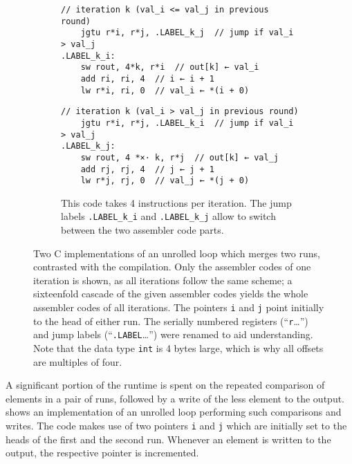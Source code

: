 \begin{figure}
\begin{subfigure}{\textwidth}
\begin{minipage}{\codewidth}
		\end{minipage}
		\hfill
		\begin{minipage}{\assemblerwidth}
			\begin{lstlisting}[language={[DPU]Assembler}]
// iteration k (val_i <= val_j in previous round)
	jgtu r*i, r*j, .LABEL_k_j  // jump if val_i > val_j
.LABEL_k_i:
	sw rout, 4*k, r*i  // out[k] ← val_i
	add ri, ri, 4  // i ← i + 1
	lw r*i, ri, 0  // val_i ← *(i + 0)
			\end{lstlisting}
			\smallskip
			\begin{lstlisting}[language={[DPU]Assembler}]
// iteration k (val_i > val_j in previous round)
	jgtu r*i, r*j, .LABEL_k_i  // jump if val_i > val_j
.LABEL_k_j:
	sw rout, 4 *×· k, r*j  // out[k] ← val_j
	add rj, rj, 4  // j ← j + 1
	lw r*j, rj, 0  // val_j ← *(j + 0)
			\end{lstlisting}
		\end{minipage}
		\caption{
			This code takes 4 instructions per iteration.
			The jump labels \lstinline|.LABEL_k_i| and \lstinline|.LABEL_k_j| allow to switch between the two assembler code parts.
		}
		\label{fig:merge:load:once}
	\end{subfigure}
	\caption{
		Two C implementations of an unrolled loop which merges two runs, contrasted with the compilation.
		Only the assembler codes of one iteration is shown, as all iterations follow the same scheme;
		a sixteenfold cascade of the given assembler codes yields the whole assembler codes of all iterations.
		The pointers \lstinline|i| and \lstinline|j| point initially to the head of either run.
		The serially numbered registers (\enquote{\lstinline|r|\dots}) and jump labels (\enquote{\lstinline|.LABEL|\dots}) were renamed to aid understanding.
		Note that the data type \lstinline|int| is 4 bytes large, which is why all offsets are multiples of four.
	}
	\label{fig:merge:load}
\end{figure}

\noindent
A significant portion of the runtime is spent on the repeated comparison of elements in a pair of runs, followed by a write of the less element to the output.
 shows an implementation of an unrolled loop performing such comparisons and writes.
The code makes use of two pointers \lstinline|i| and \lstinline|j| which are initially set to the heads of the first and the second run.
Whenever an element is written to the output, the respective pointer is incremented.

